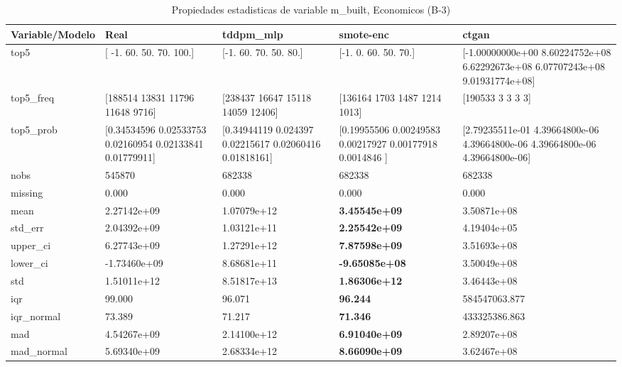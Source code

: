 \begin{table}[H]
\centering
\fontsize{8}{14}\selectfont
\caption{Propiedades  estadisticas de variable m\_built, Economicos (B-3)}
\label{table-stats-economicos-b-3-m_built}
\begin{tabular}{|l|m{10em}|m{10em}|m{10em}|m{10em}|}
\hline
 \rowcolor[gray]{0.8}
Variable/Modelo & Real & tddpm\_mlp & smote-enc & ctgan \\
\hline top5 & [ -1.  60.  50.  70. 100.] & [-1. 60. 70. 50. 80.] & [-1.  0. 60. 50. 70.] & [-1.00000000e+00  8.60224752e+08  6.62292673e+08  6.07707243e+08
  9.01931774e+08] \\
\hline top5\_freq & [188514  13831  11796  11648   9716] & [238437  16647  15118  14059  12406] & [136164   1703   1487   1214   1013] & [190533      3      3      3      3] \\
\hline top5\_prob & [0.34534596 0.02533753 0.02160954 0.02133841 0.01779911] & [0.34944119 0.024397   0.02215617 0.02060416 0.01818161] & [0.19955506 0.00249583 0.00217927 0.00177918 0.0014846 ] & [2.79235511e-01 4.39664800e-06 4.39664800e-06 4.39664800e-06
 4.39664800e-06] \\
\hline nobs & 545870 & 682338 & 682338 & 682338 \\
\hline missing & 0.000 & 0.000 & 0.000 & 0.000 \\
\hline mean & 2.27142e+09 & \cellcolor[rgb]{0.9, 0.54, 0.52} 1.07079e+12 & \bfseries 3.45545e+09 & 3.50871e+08 \\
\hline std\_err & 2.04392e+09 & \cellcolor[rgb]{0.9, 0.54, 0.52} 1.03121e+11 & \bfseries 2.25542e+09 & 4.19404e+05 \\
\hline upper\_ci & 6.27743e+09 & \cellcolor[rgb]{0.9, 0.54, 0.52} 1.27291e+12 & \bfseries 7.87598e+09 & 3.51693e+08 \\
\hline lower\_ci & -1.73460e+09 & \cellcolor[rgb]{0.9, 0.54, 0.52} 8.68681e+11 & \bfseries -9.65085e+08 & 3.50049e+08 \\
\hline std & 1.51011e+12 & \cellcolor[rgb]{0.9, 0.54, 0.52} 8.51817e+13 & \bfseries 1.86306e+12 & 3.46443e+08 \\
\hline iqr & 99.000 & 96.071 & \bfseries 96.244 & \cellcolor[rgb]{0.9, 0.54, 0.52} 584547063.877 \\
\hline iqr\_normal & 73.389 & 71.217 & \bfseries 71.346 & \cellcolor[rgb]{0.9, 0.54, 0.52} 433325386.863 \\
\hline mad & 4.54267e+09 & \cellcolor[rgb]{0.9, 0.54, 0.52} 2.14100e+12 & \bfseries 6.91040e+09 & 2.89207e+08 \\
\hline mad\_normal & 5.69340e+09 & \cellcolor[rgb]{0.9, 0.54, 0.52} 2.68334e+12 & \bfseries 8.66090e+09 & 3.62467e+08 \\

\end{tabular}
\end{table}
